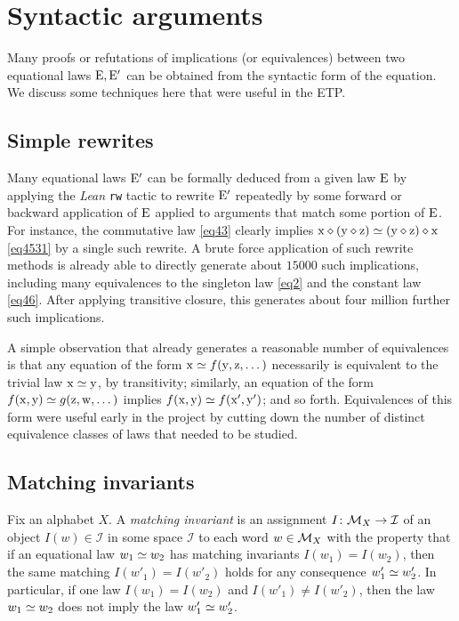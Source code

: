 
\section{Syntactic arguments}\label{syntactic-sec}

Many proofs or refutations of implications (or equivalences) between two equational laws $\mathrm{E},\mathrm{E}'$ can be obtained from the syntactic form of the equation.  We discuss some techniques here that were useful in the ETP.

\subsection{Simple rewrites}\label{rewrite-sec}

Many equational laws $\mathrm{E}'$ can be formally deduced from a given law $\mathrm{E}$ by applying the \emph{Lean} \texttt{rw} tactic to rewrite $\mathrm{E}'$ repeatedly by some forward or backward application of $\mathrm{E}$ applied to arguments that match some portion of $\mathrm{E}$.  For instance, the commutative law \eqref{eq43} clearly implies $\mathrm{x} \diamond (\mathrm{y} \diamond \mathrm{z}) \simeq (\mathrm{y} \diamond \mathrm{z}) \diamond \mathrm{x}$ \eqref{eq4531}
by a single such rewrite.  A brute force application of such rewrite methods is already able to directly generate about $\num{15000}$ such implications, including many equivalences to the singleton law \eqref{eq2} and the constant law \eqref{eq46}.  After applying transitive closure, this generates about four million further such implications.

A simple observation that already generates a reasonable number of equivalences is that any equation of the form $\mathrm{x} \simeq f(\mathrm{y},\mathrm{z},\dots)$ necessarily is equivalent to the trivial law $\mathrm{x} \simeq \mathrm{y}$, by transitivity; similarly, an equation of the form $f(\mathrm{x},\mathrm{y}) \simeq g(\mathrm{z},\mathrm{w},\dots)$ implies $f(\mathrm{x},\mathrm{y}) \simeq f(\mathrm{x}',\mathrm{y}')$; and so forth.  Equivalences of this form were useful early in the project by cutting down the number of distinct equivalence classes of laws that needed to be studied.

\subsection{Matching invariants}

Fix an alphabet $X$. A \emph{matching invariant} is an assignment $I \colon {\mathcal{M}}_X \to {\mathcal I}$ of an object $I(w) \in {\mathcal I}$ in some space ${\mathcal I}$ to each word $w \in {\mathcal{M}}_X$ with the property that if an equational law $w_1 \simeq w_2$ has matching invariants $I(w_1)=I(w_2)$, then the same matching $I(w'_1) = I(w'_2)$ holds for any consequence $w'_1 \simeq w'_2$.  In particular, if one law $I(w_1)=I(w_2)$ and $I(w'_1) \neq I(w'_2)$, then the law $w_1 \simeq w_2$ does not imply the law $w'_1 \simeq w'_2$.

